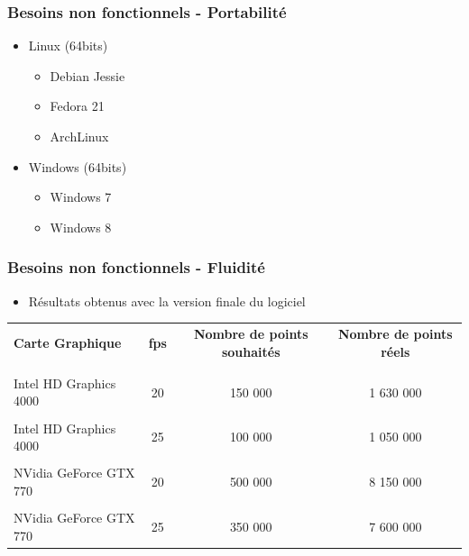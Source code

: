 \documentclass{beamer}
\begin{document}
\begin{frame}
\frametitle{Besoins non fonctionnels - Portabilité}
\begin{itemize}[label=$\bullet$]
 	\item Linux (64bits)
 	\begin{itemize}[label=$\checkmark$]
	\item Debian Jessie 
	\item Fedora 21
	\item ArchLinux
	\end{itemize}
	\item Windows (64bits)
	\begin{itemize}[label=$\checkmark$]
	\item Windows 7
	\item Windows 8 
	\end{itemize}
\end{itemize}

\end{frame}


\begin{frame}
\frametitle{Besoins non fonctionnels - Fluidité}
\begin{itemize}[label=$\bullet$]
\item Résultats obtenus avec la version finale du logiciel
\end{itemize}
{\fontsize{7}{8}\selectfont
{}
\begin{tabular}{lccc}

\textbf{Carte Graphique} & \textbf{fps} & \textbf{Nombre de points souhaités}& \textbf{Nombre de points réels}\\
\\
\hline
\\
Intel HD Graphics 4000 &
20 & 150 000 &  1 630 000\\
\hline
\\
Intel HD Graphics 4000 &
25 & 
100 000 & 1 050 000 \\
\hline
\\
NVidia GeForce GTX 770 & 20 & 500 000 & 8 150 000\\
\hline
\\
NVidia GeForce GTX 770 & 25 &
350 000 & 7 600 000\\

\end{tabular}
}

\end{frame}
\end{document}
